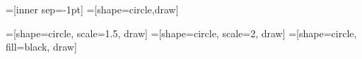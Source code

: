 
=[inner sep=-1pt]
=[shape=circle,draw]

=[shape=circle, scale=1.5, draw]
=[shape=circle, scale=2, draw]
=[shape=circle, fill=black, draw]


\newcommand*{\StrikeThruDistance}{0.15cm}%
\newcommand*{\StrikeThru}{\StrikeThruDistance,\StrikeThruDistance}%






\newcommand{\linmonw} {\xymatrixcolsep{4mm} \xymatrix{ \ar@{-||}[r]^{\circ} & }}
\newcommand{\linmonwl} {\xymatrixcolsep{4mm} \xymatrix{ \ar@{-||}[r]^{\otimes\;\tri} & }}
\newcommand{\linmonwr} {\xymatrixcolsep{4mm} \xymatrix{ \ar@{-||}[r]^{\tri\;\otimes} & }}
\newcommand{\linmonwrdavid} {\xymatrixcolsep{4mm} \xymatrix{ \ar@{-||}[r]^{\otimes\;\tri} & }}
\newcommand{\linmonwldavid} {\xymatrixcolsep{4mm} \xymatrix{ \ar@{-||}[r]^{\tri\;\otimes} & }}
\newcommand{\linmondavid} {\xymatrixcolsep{4mm} \xymatrix{ \ar@{-||}[r] & }}

\newcommand{\lincomonb} {\xymatrixcolsep{4mm} \xymatrix{ \ar@{-||}[r]_{\bullet} & }}
\newcommand{\lincomonw} {\xymatrixcolsep{4mm} \xymatrix{ \ar@{-||}[r]_{\circ} & }}
\newcommand{\lincomonwr} {\xymatrixcolsep{4mm} \xymatrix{ \ar@{-||}[r]_{\tri\;\otimes} & }}
\newcommand{\lincomonwl} {\xymatrixcolsep{4mm} \xymatrix{ \ar@{-||}[r]_{\otimes\;\tri} & }}

\newcommand{\linbialgw} {\xymatrixcolsep{4mm} \xymatrix{ \ar@{-||}[r]^{\circ}_{\circ} & }}
\newcommand{\linbialgwl} {\xymatrixcolsep{4mm} \xymatrix{ \ar@{-||}[r]^{\otimes\;\tri}_{\otimes\;\tri} & }}
\newcommand{\linbialgwr} {\xymatrixcolsep{4mm} \xymatrix{ \ar@{-||}[r]^{\tri\;\otimes}_{\tri\;\otimes} & }}
\newcommand{\linbialgwb} {\xymatrixcolsep{4mm} \xymatrix{ \ar@{-||}[r]^{\circ}_{\bullet} & }}


